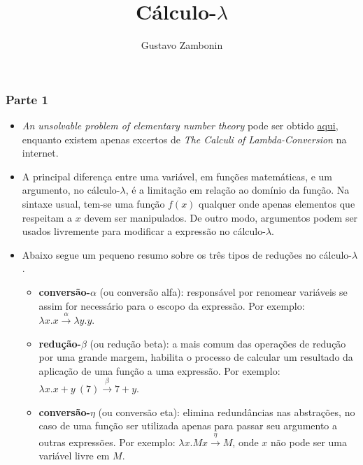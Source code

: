 \documentclass{../sftex/sftex}
\title{Cálculo-$\lambda$}
\author{Gustavo Zambonin}
\begin{document}
\maketitle

\subsubsection*{Parte 1}
\begin{itemize}
    \item \emph{An unsolvable problem of elementary number theory} pode ser
    obtido
    \href{http://www.ics.uci.edu/~lopes/teaching/inf212W12/readings/church.pdf}
    {aqui}, enquanto existem apenas excertos de \textit{The Calculi of
    Lambda-Conversion} na internet.

    \item A principal diferença entre uma variável, em funções matemáticas, e um
    argumento, no cálculo-$\lambda$, é a limitação em relação ao domínio da
    função. Na sintaxe usual, tem-se uma função $f(x)$ qualquer onde apenas
    elementos que respeitam a $x$ devem ser manipulados. De outro modo,
    argumentos podem ser usados livremente para modificar a expressão no
    cálculo-$\lambda$.

    \item Abaixo segue um pequeno resumo sobre os três tipos de reduções no
    cálculo-$\lambda$.
    \begin{itemize}
        \item \textbf{conversão-$\alpha$} (ou conversão alfa): responsável por
        renomear variáveis se assim for necessário para o escopo da expressão.
        Por exemplo: $\lambda x.x \stackrel{\alpha}{\rightarrow} \lambda y.y$.

        \item \textbf{redução-$\beta$} (ou redução beta): a mais comum das
        operações de redução por uma grande margem, habilita o processo de
        calcular um resultado da aplicação de uma função a uma expressão. Por
        exemplo: $\lambda x.x + y\ (7) \stackrel{\beta}{\rightarrow} 7 + y$.

        \item \textbf{conversão-$\eta$} (ou conversão eta): elimina redundâncias
        nas abstrações, no caso de uma função ser utilizada apenas para passar
        seu argumento a outras expressões. Por exemplo: $\lambda x.Mx
        \stackrel{\eta}{\rightarrow} M$, onde $x$ não pode ser uma variável
        livre em $M$.
    \end{itemize}
\end{itemize}
\end{document}
